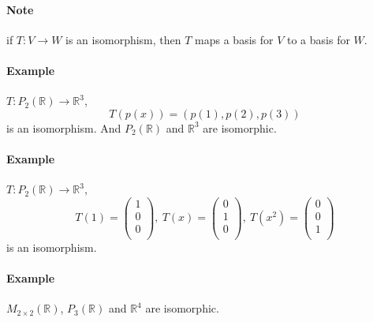 \documentclass[11pt]{article}
\begin{document}
	\paragraph{Note} if $T: V \to W$ is an isomorphism, then $T$ maps a basis for $V$ to a basis for $W$.
	
	\paragraph{Example} $T: P_2(\mathbb{R}) \to \mathbb{R}^3$, 
	\[
		T(p(x)) = (p(1), p(2), p(3))
	\]
	is an isomorphism. And $P_2(\mathbb{R})$ and $\mathbb{R}^3$ are isomorphic.
	
	\paragraph{Example} $T: P_2(\mathbb{R}) \to \mathbb{R}^3$, 
	\[
		T(1) = \begin{pmatrix}
			1 \\
			0 \\
			0 \\
		\end{pmatrix},\ T(x) = \begin{pmatrix}
			0 \\
			1 \\
			0 \\
		\end{pmatrix},\ T(x^2) = \begin{pmatrix}
			0 \\
			0 \\
			1 \\
		\end{pmatrix}
	\] is an isomorphism.
	\paragraph{Example} $M_{2 \times 2}(\mathbb{R})$, $P_3(\mathbb{R})$ and $\mathbb{R}^4$ are isomorphic.
	
\end{document}
